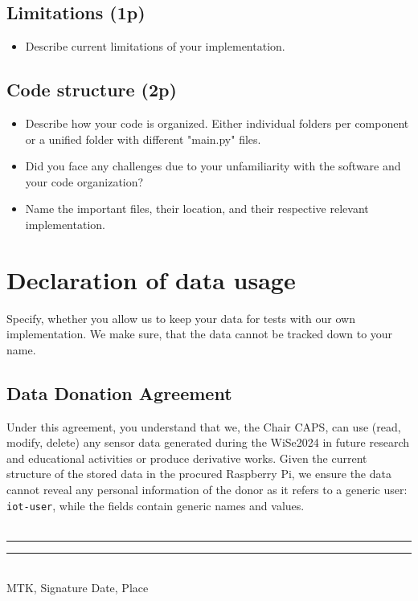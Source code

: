 \documentclass[A4,10pt]{article}
\begin{document}
\subsection{ Limitations (1p)}

\begin{itemize}
	\item Describe current limitations of your implementation.
\end{itemize}


\subsection{ Code structure (2p)}

\begin{itemize}
	\item Describe how your code is organized. Either individual folders per component or a unified folder with different "main.py" files.
	\item Did you face any challenges due to your unfamiliarity with the software and your code organization?
	\item Name the important files, their location, and their respective relevant implementation.
\end{itemize}


\section{Declaration of data usage}

Specify, whether you allow us to keep your data for tests with our own implementation. We make sure, that the data cannot be tracked down to your name. 

\subsection{Data Donation Agreement}
Under this agreement, you understand that we, the Chair CAPS, can use (read, modify, delete) any sensor data generated during the WiSe2024 in future research and educational activities or produce derivative works. Given the current structure of the stored data in the procured Raspberry Pi, we ensure the data cannot reveal any personal information of the donor as it refers to a generic user: \texttt{iot-user}, while the fields contain generic names and values.
\bigskip
\\
\\

\noindent\rule{5cm}{0.4pt} \hfill \noindent\rule{5cm}{0.4pt}\\
MTK, Signature \hfill Date, Place
\end{document}
